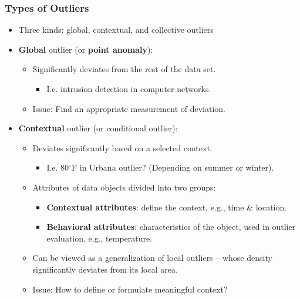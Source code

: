 \begin{frame}
  \frametitle{Types of Outliers}
  \begin{itemize}
  \item Three kinds: global, contextual, and collective outliers
  \item \textbf{Global} outlier (or \textbf{\color{airforceblue}point anomaly}):
    \begin{itemize}
    \item Significantly deviates from the rest of the data set.
      \begin{itemize}
      \item I.e. intrusion detection in computer networks.
      \end{itemize}
    \item Issue: Find an appropriate measurement of deviation.
    \end{itemize}
  \item \textbf{Contextual} outlier (or conditional outlier):
    \begin{itemize}
    \item Deviates significantly based on a selected context.
      \begin{itemize}
      \item I.e.  $80^{\circ}$F in Urbana outlier? (Depending on summer or winter).
      \end{itemize}
    \item Attributes of data objects divided into two groups:
      \begin{itemize}
      \item \textbf{Contextual attributes}: define the context, e.g., time \& location.
      \item \textbf{Behavioral attributes}: characteristics of the object, used in outlier evaluation, e.g., temperature.
      \end{itemize}
    \item Can be viewed as a generalization of local outliers -- whose density significantly deviates from its local area.
    \item Issue: How to define or formulate meaningful context?
    \end{itemize}
  \end{itemize}


\end{frame}
